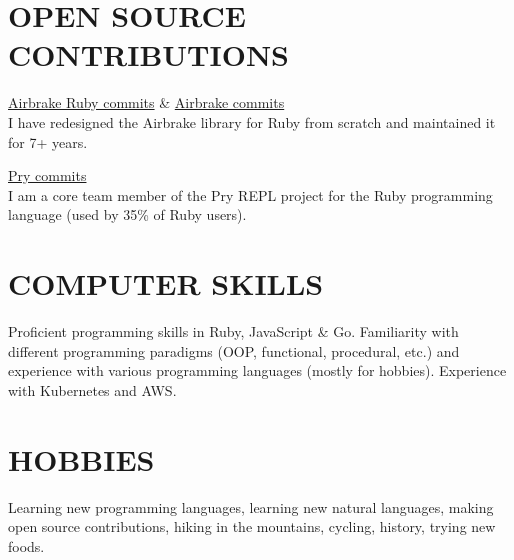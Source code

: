 \documentclass{res}
\begin{document}
\begin{resume}
  \section{OPEN SOURCE CONTRIBUTIONS}

  \href{https://github.com/airbrake/airbrake-ruby/commits?author=kyrylo}{Airbrake
    Ruby commits} \&
  \href{https://github.com/airbrake/airbrake/commits?author=kyrylo}{Airbrake
    commits}
  \\
  I have redesigned the Airbrake library for Ruby from scratch and maintained it
  for 7+ years.

  \href{https://github.com/pry/pry/commits?author=kyrylo}{Pry commits}
  \\
  I am a core team member of the Pry REPL project for the Ruby
  programming language (used by 35\% of Ruby users).

  \section{COMPUTER SKILLS}

  Proficient programming skills in Ruby, JavaScript \& Go. Familiarity with
  different programming paradigms (OOP, functional, procedural, etc.) and
  experience with various programming languages (mostly for hobbies). Experience
  with Kubernetes and AWS.

  \section{HOBBIES}

  Learning new programming languages, learning new natural languages, making
  open source contributions, hiking in the mountains, cycling, history,
  trying new foods.

\end{resume}
\end{document}
